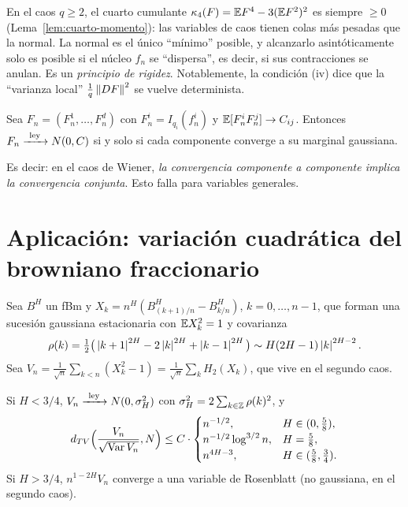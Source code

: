 \begin{intuicion}
En el caos $q\ge2$, el cuarto cumulante $\kappa_4(F)=\mathbb{E} F^4-3(\mathbb{E} F^2)^2$ es siempre $\ge0$ (Lema~\ref{lem:cuarto-momento}):
las variables de caos tienen colas más pesadas que la normal. La normal es el único
``mínimo'' posible, y alcanzarlo asintóticamente solo es posible si el núcleo $f_n$ se ``dispersa'',
es decir, si sus contracciones se anulan. Es un \emph{principio de rigidez}. Notablemente, la
condición (iv) dice que la ``varianza local'' $\frac1q\left\lVert DF\right\rVert^2$ se vuelve determinista.
\end{intuicion}

\begin{teorema}
Sea $F_n=(F^1_n,\dots,F^d_n)$ con $F^i_n=I_{q_i}(f^i_n)$ y $\mathbb{E}[F^i_nF^j_n]\to
C_{ij}$. Entonces $F_n\xrightarrow{\ \mathrm{ley}\ } N(0,C)$ si y solo si cada componente converge a su marginal
gaussiana.
\end{teorema}

Es decir: en el caos de Wiener, \emph{la convergencia componente a componente implica la
convergencia conjunta}. Esto falla para variables generales.

\section{Aplicación: variación cuadrática del browniano fraccionario}
Sea $B^H$ un fBm y $X_k=n^H(B^H_{(k+1)/n}-B^H_{k/n})$, $k=0,\dots,n-1$, que forman una sucesión
gaussiana estacionaria con $\mathbb{E} X_k^2=1$ y covarianza
\[
  \rho(k)=\tfrac12\big(\left\lvert k+1\right\rvert^{2H}-2\left\lvert k\right\rvert^{2H}+\left\lvert k-1\right\rvert^{2H}\big)\sim H(2H-1)\left\lvert k\right\rvert^{2H-2}.
\]
Sea $V_n=\frac1{\sqrt n}\sum_{k<n}(X_k^2-1)=\frac1{\sqrt n}\sum_kH_2(X_k)$, que vive en el segundo caos.

\begin{teorema}
Si $H<3/4$, $V_n\xrightarrow{\ \mathrm{ley}\ } N(0,\sigma_H^2)$ con
$\sigma_H^2=2\sum_{k\in\mathbb{Z}}\rho(k)^2$, y
\[
  d_{TV}\Big(\frac{V_n}{\sqrt{\operatorname{Var} V_n}},N\Big)\le C\cdot
  \begin{cases}
    n^{-1/2}, & H\in(0,\frac58),\\
    n^{-1/2}\log^{3/2}n, & H=\frac58,\\
    n^{4H-3}, & H\in(\frac58,\frac34).
  \end{cases}
\]
Si $H>3/4$, $n^{1-2H}V_n$ converge a una variable de \textup{Rosenblatt} (no gaussiana, en el segundo
caos).
\end{teorema}


